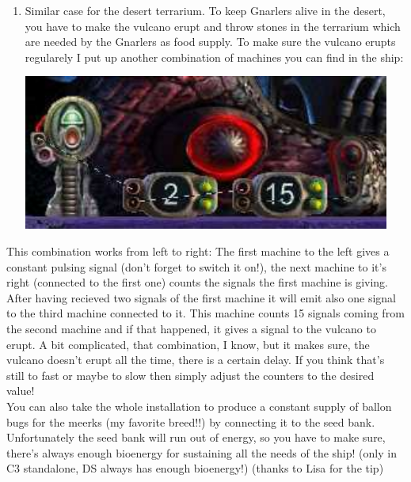 \documentclass[11pt,twoside,a4paper]{article}
\begin{document}
{\begin{enumerate}
\begin{minipage}[ht]{0.77\textwidth}
			\end{minipage}
		\item \begin{minipage}[h]{0.675\textwidth} Similar case for the desert terrarium. To keep Gnarlers alive in the desert, you have to make the vulcano erupt and throw stones in the terrarium which are needed by the Gnarlers as food supply. To make sure the vulcano erupts regularely I put up another combination of machines you can find in the ship:
			\end{minipage} \hfill \begin{minipage}[ht]{0.30\textwidth} \includegraphics[width=0.95\textwidth]{img/deshelp.jpg} \end{minipage}
	\end{enumerate}
	
	This combination works from left to right: The first machine to the left gives a constant pulsing signal (don't forget to switch it on!), the next machine to it's right (connected to the first one) counts the signals the first machine is giving. After having recieved two signals of the first machine it will emit also one signal to the third machine connected to it. This machine counts 15 signals coming from the second machine and if that happened, it gives a signal to the vulcano to erupt. A bit complicated, that combination, I know, but it makes sure, the vulcano doesn't erupt all the time, there is a certain delay. If you think that's still to fast or maybe to slow then simply adjust the counters to the desired value! ~\\
	
	You can also take the whole installation to produce a constant supply of ballon bugs for the meerks (my favorite breed!!) by connecting it to the seed bank. Unfortunately the seed bank will run out of energy, so you have to make sure, there's always enough bioenergy for sustaining all the needs of the ship! (only in C3 standalone, DS always has enough bioenergy!) (thanks to Lisa for the tip) ~\\
	
}
\end{document}
